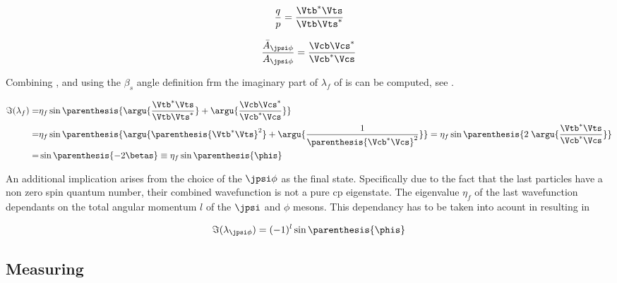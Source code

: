 \begin{equation}
 \frac{q}{p} = \frac{\Vtb^*\Vts}{\Vtb\Vts^*}
\label{qoverp}
\end{equation}

\begin{equation}
 \frac{\bar{A}_{\jpsi\phi}} {A_{\jpsi\phi}} = \frac{\Vcb\Vcs^*}{\Vcb^*\Vcs}
\label{af_afbar}
\end{equation}

\noindent Combining ,  and using the $\beta_s$ angle definition frm  the imaginary part of
$\lambda_{f}$ of  is can be computed, see .


\begin{align}
  \centering
 \Im(\lambda_f) =& \eta_f\sin\parenthesis{ \argu{\frac{\Vtb^*\Vts}{\Vtb\Vts^*}} + \argu{\frac{\Vcb\Vcs^*}{\Vcb^*\Vcs}} } \nonumber \\
                =& \eta_f\sin\parenthesis{ \argu{\parenthesis{\Vtb^*\Vts}^2}    + \argu{\frac{1}{\parenthesis{\Vcb^*\Vcs}^2}} }
                = \eta_f\sin\parenthesis{  2 \; \argu{\frac{\Vtb^*\Vts}{\Vcb^*\Vcs}} } \nonumber \\
                =& \sin\parenthesis{-2\betas}
                \equiv \eta_f\sin\parenthesis{\phis}
 \label{phis_def}
\end{align}

\noindent An additional implication arises from the choice of the $\jpsi\phi$ as the final state.
Specifically due to the fact that the last particles have a non zero spin quantum number, their combined wavefunction
is not a pure cp eigenstate. The eigenvalue $\eta_f$ of the last wavefunction dependants on the total angular momentum
$l$ of the $\jpsi$ and $\phi$ mesons. This dependancy has to be taken into acount in  resulting in 

\begin{equation}
 \Im(\lambda_{\jpsi\phi}) = (-1)^l\sin\parenthesis{\phis}
 \label{phis_jpsiphi_def}
\end{equation}

\subsection{Measuring \phis}
\label{measuring_phis}

